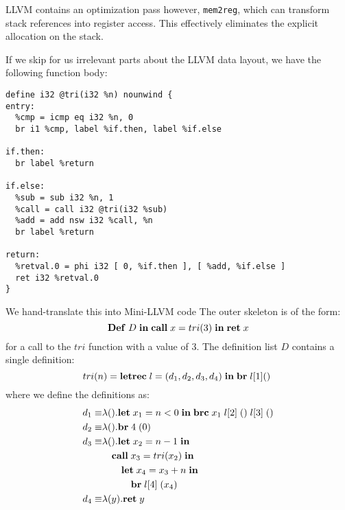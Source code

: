 \documentclass[a4paper, oneside, 10pt, final]{memoir}
\begin{document}
LLVM contains an optimization pass however, \texttt{mem2reg}, which
can transform stack references into register access. This effectively
eliminates the explicit allocation on the stack.

If we skip for us irrelevant parts about the LLVM data layout, we have
the following function body:
\begin{verbatim}
define i32 @tri(i32 %n) nounwind {
entry:
  %cmp = icmp eq i32 %n, 0
  br i1 %cmp, label %if.then, label %if.else

if.then:
  br label %return

if.else:
  %sub = sub i32 %n, 1
  %call = call i32 @tri(i32 %sub)
  %add = add nsw i32 %call, %n
  br label %return

return:
  %retval.0 = phi i32 [ 0, %if.then ], [ %add, %if.else ]
  ret i32 %retval.0
}
\end{verbatim}

We hand-translate this into Mini-LLVM code The outer skeleton is of
the form:
\begin{equation*}
  \mathbf{Def} \; D \; \mathbf{in} \; \mathbf{call} \; x = tri (3)\; \mathbf{in} \; \mathbf{ret} \; x
\end{equation*}
for a call to the $tri$ function with a value of 3. The definition
list $D$ contains a single definition:
\begin{equation*}
  tri(n) = \mathbf{letrec} \; l = (d_1, d_2, d_3, d_4) \; \mathbf{in} \; \mathbf{br} \; l[1]{()} \; \end{equation*}
where we define the definitions as:
\begin{align*}
  d_1 \equiv &\lambda().\mathbf{let} \; x_1 = n < 0 \; \mathbf{in} \; \mathbf{brc} \; x_1 \; l[2] \; () \; l[3] \; ()\\
  d_2 \equiv &\lambda().\mathbf{br} \; 4 \; (0)\\
  d_3 \equiv &\lambda().\mathbf{let} \; x_2 = n - 1 \; \mathbf{in} \; \\ & \quad \mathbf{call} \; x_3 = tri (x_2)\; \mathbf{in} \; \\ & \qquad \mathbf{let} \; x_4 = x_3 + n \; \mathbf{in} \; \\ & \qquad \quad \mathbf{br} \; l[4] \; (x_4)\\
  d_4 \equiv &\lambda(y).\mathbf{ret} \; y
\end{align*}
\end{document}
